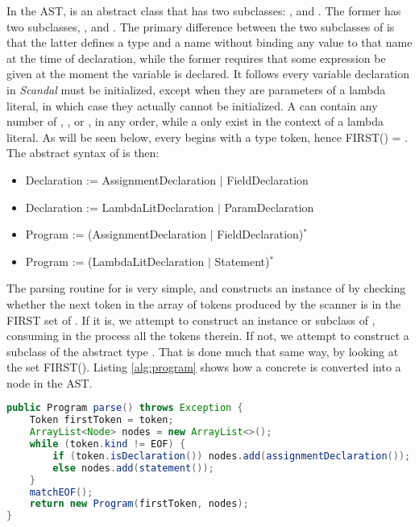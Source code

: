 In the AST,  is an abstract class that has two subclasses: , and . The former has two subclasses, , and . The primary difference between the two subclasses of  is that the latter defines a type and a name without binding any value to that name at the time of declaration, while the former requires that some expression be given at the moment the variable is declared. It follows every variable declaration in \emph{Scandal} must be initialized, except when they are parameters of a lambda literal, in which case they actually cannot be initialized. A  can contain any number of , , or , in any order, while a  only exist in the context of a lambda literal. As will be seen below, every  begins with a type token, hence FIRST() = . The abstract syntax of  is then:

\begin{itemize}
	\item Declaration := AssignmentDeclaration $|$ FieldDeclaration
	\item Declaration := LambdaLitDeclaration $|$ ParamDeclaration
	\item Program := (AssignmentDeclaration $|$ FieldDeclaration)$^*$
	\item Program := (LambdaLitDeclaration $|$ Statement)$^*$
\end{itemize}

The parsing routine for  is very simple, and constructs an instance of  by checking whether the next token in the array of tokens produced by the scanner is in the FIRST set of . If it is, we attempt to construct an instance or subclass of , consuming in the process all the tokens therein. If not, we attempt to construct a subclass of the abstract type . That is done much that same way, by looking at the set FIRST(). Listing \ref{alg:program} shows how a concrete  is converted into a  node in the AST.

\begin{lstlisting}[language=Java,caption={Parsing topmost-level constructs in \emph{Scandal}.},label={alg:program}]
public Program parse() throws Exception {
	Token firstToken = token;
	ArrayList<Node> nodes = new ArrayList<>();
	while (token.kind != EOF) {
		if (token.isDeclaration()) nodes.add(assignmentDeclaration());
		else nodes.add(statement());
	}
	matchEOF();
	return new Program(firstToken, nodes);
}
\end{lstlisting}

